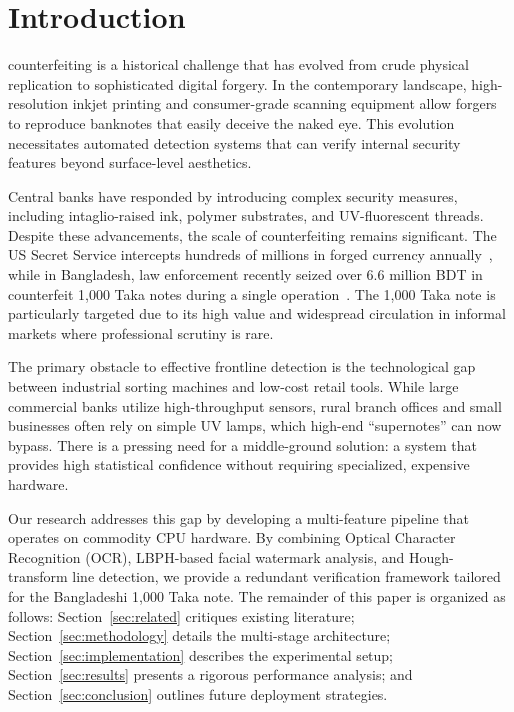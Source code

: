 \documentclass[journal]{IEEEtran}
\begin{document}
\section{Introduction}
\label{sec:intro}

 counterfeiting is a historical challenge that has evolved from crude physical replication to sophisticated digital forgery. In the contemporary landscape, high-resolution inkjet printing and consumer-grade scanning equipment allow forgers to reproduce banknotes that easily deceive the naked eye. This evolution necessitates automated detection systems that can verify internal security features beyond surface-level aesthetics.

Central banks have responded by introducing complex security measures, including intaglio-raised ink, polymer substrates, and UV-fluorescent threads. Despite these advancements, the scale of counterfeiting remains significant. The US Secret Service intercepts hundreds of millions in forged currency annually~\cite{usss2022}, while in Bangladesh, law enforcement recently seized over 6.6 million BDT in counterfeit 1,000 Taka notes during a single operation~\cite{bdnews2016}. The 1,000 Taka note is particularly targeted due to its high value and widespread circulation in informal markets where professional scrutiny is rare.

The primary obstacle to effective frontline detection is the technological gap between industrial sorting machines and low-cost retail tools. While large commercial banks utilize high-throughput sensors, rural branch offices and small businesses often rely on simple UV lamps, which high-end ``supernotes'' can now bypass. There is a pressing need for a middle-ground solution: a system that provides high statistical confidence without requiring specialized, expensive hardware.

Our research addresses this gap by developing a multi-feature pipeline that operates on commodity CPU hardware. By combining Optical Character Recognition (OCR), LBPH-based facial watermark analysis, and Hough-transform line detection, we provide a redundant verification framework tailored for the Bangladeshi 1,000 Taka note. The remainder of this paper is organized as follows: Section~\ref{sec:related} critiques existing literature; Section~\ref{sec:methodology} details the multi-stage architecture; Section~\ref{sec:implementation} describes the experimental setup; Section~\ref{sec:results} presents a rigorous performance analysis; and Section~\ref{sec:conclusion} outlines future deployment strategies.
\end{document}
